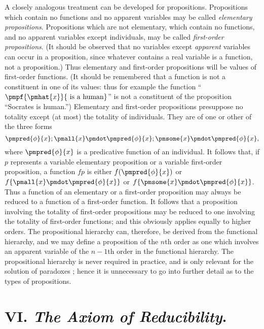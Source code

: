 \documentclass[letterpaper,12pt,openany,leqno]{book}
\newcommand{\pagefirst}[1]{\marginnote[\boxed{\text{#1}}]{\boxed{\text{#1}}}}
\begin{document}
A closely analogous treatment can be developed for propositions. Propositions which contain no functions and no apparent variables may be called \textit{elementary propositions}. Propositions which are not elementary, which contain no functions, and no apparent variables except individuals, may be called \textit{first-order propositions}. (It should be observed that no variables except \textit{apparent} variables can occur in a proposition, since whatever contains a real variable is a function, not a proposition.) Thus elementary and first-order propositions will be values of first-order functions. (It should be remembered that a function is not a constituent in one of its values: thus for example the function ``$\pmpf{\pmhat{x}}{\text{ is a human}}$'' is not a constituent of the proposition ``Socrates is human.'') Elementary and first-order propositions presuppose no totality except (at most) the totality of individuals. They are of one or other of the three forms
\[
	\pmpred{\phi}{x}; \pmall{x}\pmdot \pmpred{\phi}{x}; \pmsome{x}\pmdot \pmpred{\phi}{x},
\]
where $\pmpred{\phi}{x}$ is a predicative function of an individual. It follows that, if $p$ represents a variable elementary proposition or a variable first-order proposition, a function $fp$ is either $f(\pmpred{\phi}{x})$ or $f\{\pmall{x}\pmdot \pmpred{\phi}{x}\}$ or $f\{\pmsome{x}\pmdot \pmpred{\phi}{x}\}$. Thus a function of an elementary or a first-order proposition may always be reduced to a function of a first-order function. It follows that a proposition involving the totality of first-order propositions may be reduced to one involving the totality of first-order functions; and this obviously applies equally to higher \pagefirst{58} orders. The propositional hierarchy can, therefore, be derived from the functional hierarchy, and we may define a proposition of the $n$th order as one which involves an apparent variable of the $n-1$th order in the functional hierarchy. The propositional hierarchy is never required in practice, and is only relevant for the solution of paradoxes ; hence it is unnecessary to go into further detail as to the types of propositions.

\section*{\centering VI. \textit{The Axiom of Reducibility}.}
\end{document}
